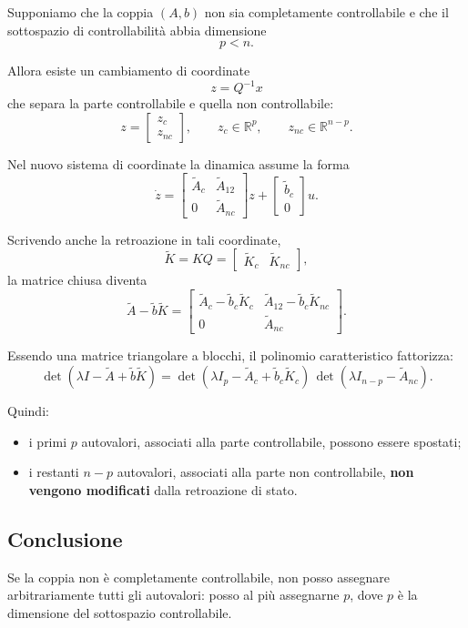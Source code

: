 Supponiamo che la coppia \((A,b)\) non sia completamente controllabile
e che il sottospazio di controllabilità abbia dimensione
\[
p<n.
\]

Allora esiste un cambiamento di coordinate
\[
z=Q^{-1}x
\]
che separa la parte controllabile e quella non controllabile:
\[
z=
\begin{bmatrix}
z_c\\
z_{nc}
\end{bmatrix},
\qquad
z_c\in\mathbb{R}^p,
\qquad
z_{nc}\in\mathbb{R}^{n-p}.
\]

Nel nuovo sistema di coordinate la dinamica assume la forma
\[
\dot z
=
\begin{bmatrix}
\tilde A_c & \tilde A_{12}\\
0 & \tilde A_{nc}
\end{bmatrix}
z
+
\begin{bmatrix}
\tilde b_c\\
0
\end{bmatrix}u.
\]

Scrivendo anche la retroazione in tali coordinate,
\[
\tilde K=KQ=
\begin{bmatrix}
\tilde K_c & \tilde K_{nc}
\end{bmatrix},
\]
la matrice chiusa diventa
\[
\tilde A-\tilde b\tilde K
=
\begin{bmatrix}
\tilde A_c-\tilde b_c\tilde K_c & \tilde A_{12}-\tilde b_c\tilde K_{nc}\\
0 & \tilde A_{nc}
\end{bmatrix}.
\]

Essendo una matrice triangolare a blocchi, il polinomio caratteristico fattorizza:
\[
\det(\lambda I-\tilde A+\tilde b\tilde K)
=
\det(\lambda I_p-\tilde A_c+\tilde b_c\tilde K_c)\,
\det(\lambda I_{n-p}-\tilde A_{nc}).
\]

Quindi:
\begin{itemize}
    \item i primi \(p\) autovalori, associati alla parte controllabile, possono essere spostati;
    \item i restanti \(n-p\) autovalori, associati alla parte non controllabile, \textbf{non vengono modificati} dalla retroazione di stato.
\end{itemize}

\subsection*{Conclusione}

Se la coppia non è completamente controllabile, non posso assegnare arbitrariamente tutti gli autovalori:
posso al più assegnarne \(p\), dove \(p\) è la dimensione del sottospazio controllabile.


